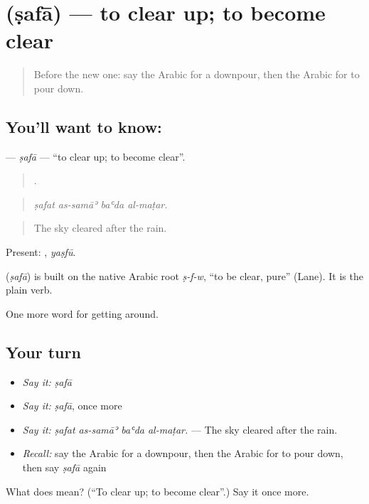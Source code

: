 \section[\texorpdfstring{\ar{صفا} (ṣafā)}{صفا (ṣafā)}]{ (ṣafā) — to clear up; to become clear}

\label{lesson:AR-C481-safa}



\begin{quote}
Before the new one: say the Arabic for a downpour, then the Arabic for to pour down.
\end{quote}

\subsection*{You'll want to know: }
\textbf{} — \emph{ṣafā} — \textquotedblleft{}to clear up; to become clear\textquotedblright{}.

\begin{quote}
   .
\end{quote}

\begin{quote}
\emph{ṣafat as-samāʾ baʿda al-maṭar.}
\end{quote}

\begin{quote}
The sky cleared after the rain.
\end{quote}

Present: , \emph{yaṣfū}.

\begin{cousinweb}
\textbf{} (\emph{ṣafā}) is built on the native Arabic root \emph{ṣ-f-w}, \textquotedblleft{}to be clear, pure\textquotedblright{} (Lane). It is the plain verb.
\end{cousinweb}

\begin{grammarlens}[title={What you've built}]
One more word for getting around.
\end{grammarlens}

\subsection*{Your turn}
\begin{itemize}
\raggedright
  \item \emph{Say it:} \emph{ṣafā}
  \item \emph{Say it:} \emph{ṣafā}, once more
  \item \emph{Say it:} \emph{ṣafat as-samāʾ baʿda al-maṭar.} — The sky cleared after the rain.
  \item \emph{Recall:} say the Arabic for a downpour, then the Arabic for to pour down, then say \emph{ṣafā} again
\end{itemize}

\begin{tcolorbox}[breakable,colback=teal!4,colframe=teal!35!black,title={Before you move on}]
What does  mean? (\textquotedblleft{}To clear up; to become clear\textquotedblright{}.) Say it once more.
\end{tcolorbox}
